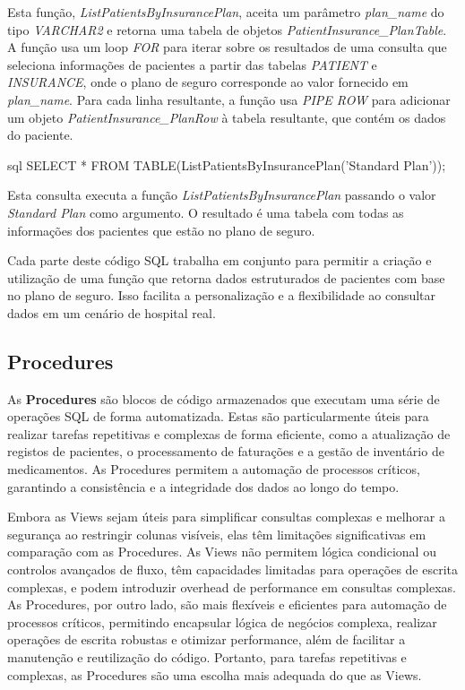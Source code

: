 Esta função, \textit{ListPatientsByInsurancePlan}, aceita um parâmetro \textit{plan\_name} do tipo \textit{VARCHAR2} e retorna uma tabela de objetos \textit{PatientInsurance\_PlanTable}. A função usa um loop \textit{FOR} para iterar sobre os resultados de uma consulta que seleciona informações de pacientes a partir das tabelas \textit{PATIENT} e \textit{INSURANCE}, onde o plano de seguro corresponde ao valor fornecido em \textit{plan\_name}. Para cada linha resultante, a função usa \textit{PIPE ROW} para adicionar um objeto \textit{PatientInsurance\_PlanRow} à tabela resultante, que contém os dados do paciente.

\begin{myminted}{sql}
SELECT * FROM TABLE(ListPatientsByInsurancePlan('Standard Plan'));
\end{myminted}

Esta consulta executa a função \textit{ListPatientsByInsurancePlan} passando o valor \textit{Standard Plan} como argumento. O resultado é uma tabela com todas as informações dos pacientes que estão no plano de seguro.

Cada parte deste código SQL trabalha em conjunto para permitir a criação e utilização de uma função que retorna dados estruturados de pacientes com base no plano de seguro. Isso facilita a personalização e a flexibilidade ao consultar dados em um cenário de hospital real.

\subsection{Procedures}

As \textbf{Procedures} são blocos de código armazenados que executam uma série de operações SQL de forma automatizada. Estas são particularmente úteis para realizar tarefas repetitivas e complexas de forma eficiente, como a atualização de registos de pacientes, o processamento de faturações e a gestão de inventário de medicamentos. As Procedures permitem a automação de processos críticos, garantindo a consistência e a integridade dos dados ao longo do tempo.

Embora as Views sejam úteis para simplificar consultas complexas e melhorar a segurança ao restringir colunas visíveis, elas têm limitações significativas em comparação com as Procedures. As Views não permitem lógica condicional ou controlos avançados de fluxo, têm capacidades limitadas para operações de escrita complexas, e podem introduzir overhead de performance em consultas complexas. As Procedures, por outro lado, são mais flexíveis e eficientes para automação de processos críticos, permitindo encapsular lógica de negócios complexa, realizar operações de escrita robustas e otimizar performance, além de facilitar a manutenção e reutilização do código. Portanto, para tarefas repetitivas e complexas, as Procedures são uma escolha mais adequada do que as Views.

